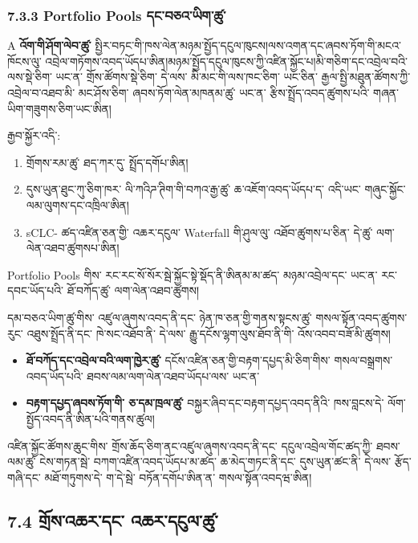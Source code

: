 \documentclass[11pt]{article}
\begin{document}
\subsubsection*{7.3.3 Portfolio Pools དང་བཅའ་ཡིག་ཚུ་}

A \textbf{འོག་གི་ཤོག་ལེབ་ཚུ་} སྤྱིར་བཏང་གི་ཁས་ལེན་མཉམ་སྤྱོད་དངུལ་ཁུངས།ལས་འགན་དང་ཞབས་ཏོག་གི་མངའ་ཁོངས་ལུ་ འབྲེལ་གཏོགས་འབད་ཡོདཔ་ཨིན།མཉམ་སྤྱོད་དངུལ་ཁུངས་ཀྱི་འཛིན་སྐྱོང་པ།མི་གཅིག་དང་འབྲེལ་བའི་ ལས་སྡེ་ཅིག་ ཡང་ན་ གྲོས་ཚོགས་སྡེ་ཅིག་ དེ་ལས་ མི་མང་གི་ལས་ཁང་ཅིག་ ཡང་ཅིན་ རྒྱལ་སྤྱི་མཐུན་ཚོགས་ཀྱི་ འབྲེལ་བ་འཐབ་མི་ མང་ཤོས་ཅིག་ ཞབས་ཏོག་ལེན་མཁནམ་ཚུ་ ཡང་ན་ རྩིས་སྤྲོད་འབད་ཚུགས་པའི་ གཞན་ཡིག་གཟུགས་ཅིག་ཡང་ཨིན།

རྒྱབ་སྐྱོར་འདི་:

\begin{enumerate}[leftmargin=*]
\item གྲོགས་རམ་ཚུ་ ཐད་ཀར་དུ་ སྤྲོད་དགོཔ་ཨིན།
\item དུས་ཡུན་ཐུང་ཀུ་ཅིག་ཁར་ ལི་ཀའིཌ་ཊིག་གི་བཀའ་རྒྱ་ཚུ་ ཆ་འཇོག་འབད་ཡོདཔ་ད་ འདི་ཡང་ གཞུང་སྐྱོང་ལམ་ལུགས་དང་འཁྲིལ་ཨིན།
\item sCLC- ཚད་འཛིན་ཅན་གྱི་ འཆར་དངུལ་ Waterfall གི་ཤུལ་ལུ་ འཐོབ་ཚུགས་པ་ཅིན་ དེ་ཚུ་ ལག་ལེན་འཐབ་ཚུགསཔ་ཨིན།
\end{enumerate}
Portfolio Pools གིས་ རང་རང་སོ་སོར་སྦེ་སྐྱོང་སྟེ་སྡོད་ནི་ཨིནམ་མ་ཚད་ མཉམ་འབྲེལ་དང་ ཡང་ན་ རང་དབང་ཡོད་པའི་ ཐོ་བཀོད་ཚུ་ ལག་ལེན་འཐབ་ཚུགས།

དམ་བཅའ་ཡིག་ཚུ་གིས་ འཛུལ་ཞུགས་འབད་ནི་དང་ ཉེན་ཁ་ཅན་གྱི་གནས་སྟངས་ཚུ་ གསལ་སྟོན་འབད་ཚུགས་རུང་ འཐུས་སྤྲོད་ནི་དང་ ཁེ་སང་འཐོབ་ནི་ དེ་ལས་ རྒྱུ་དངོས་ལྷག་ལུས་ཐོབ་ནི་གི་ འོས་འབབ་བཟོ་མི་ཚུགས།

\begin{itemize}[leftmargin=*]
\item \textbf{ཐོ་བཀོད་དང་འབྲེལ་བའི་ལག་ཁྱེར་ཚུ་} དངོས་འཛིན་ཅན་གྱི་བརྟག་དཔྱད་མི་ཅིག་གིས་ གསལ་བསྒྲགས་འབད་ཡོད་པའི་ ཐབས་ལམ་ལག་ལེན་འཐབ་ཡོདཔ་ལས་ ཡང་ན་
\item \textbf{བརྟག་དཔྱད་ཞབས་ཏོག་གི་ ཅ་དམ་ཁྲལ་ཚུ་} བསྐྱར་ཞིབ་དང་བརྟག་དཔྱད་འབད་ནིའི་ ཁས་བླངས་དེ་ ལོག་སྤྱོད་འབད་ནི་ཨིན་པའི་གནས་ཚུལ།
\end{itemize}
འཛིན་སྐྱོང་ཚོགས་ཆུང་གིས་ གྲོས་ཆོད་ཅིག་ནང་འཛུལ་ཞུགས་འབད་ནི་དང་ དངུལ་འབྲེལ་གོང་ཚད་ཀྱི་ ཐབས་ལམ་ཚུ་ ངེས་གཏན་སྦེ་ བཀག་འཛིན་འབད་ཡོདཔ་མ་ཚད་ ཆ་མེད་གཏང་ནི་དང་ དུས་ཡུན་ཚང་ནི་ དེ་ལས་ རྩོད་གཞི་དང་ མཐོ་གཏུགས་དེ་ ག་དེ་སྦེ་ བཏོན་དགོཔ་ཨིན་ན་ གསལ་སྟོན་འབདཝ་ཨིན།

\subsection*{7.4 གྲོས་འཆར་དང་ འཆར་དངུལ་ཚུ་}
\end{document}
